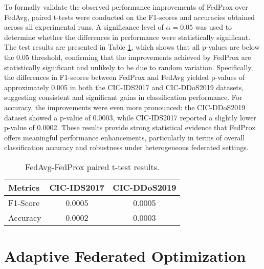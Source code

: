 To formally validate the observed performance improvements of FedProx over FedAvg, paired t-tests were conducted on the F1-scores and accuracies obtained across all experimental runs. A significance level of $\alpha=0.05$ was used to determine whether the differences in performance were statistically significant. The test results are presented in Table \ref{tbl:fedavg_fedprox_compare}, which shows that all p-values are below the 0.05 threshold, confirming that the improvements achieved by FedProx are statistically significant and unlikely to be due to random variation. Specifically, the differences in F1-scores between FedProx and FedAvg yielded p-values of approximately 0.005 in both the CIC-IDS2017 and CIC-DDoS2019 datasets, suggesting consistent and significant gains in classification performance. For accuracy, the improvements were even more pronounced: the CIC-DDoS2019 dataset showed a p-value of 0.0003, while CIC-IDS2017 reported a slightly lower p-value of 0.0002. These results provide strong statistical evidence that FedProx offers meaningful performance enhancements, particularly in terms of overall classification accuracy and robustness under heterogeneous federated settings.


\begin{table}[h]
    \caption{FedAvg-FedProx paired t-test results.}
    \centering
    \begin{tabular}{l|c|c}
        Metrics & CIC-IDS2017 & CIC-DDoS2019 \\
        \hline\hline
        F1-Score & 0.0005 & 0.0005 \\
        Accuracy & 0.0002 & 0.0003 \\

    \end{tabular}
    \label{tbl:fedavg_fedprox_compare}
\end{table}

\section{Adaptive Federated Optimization}

